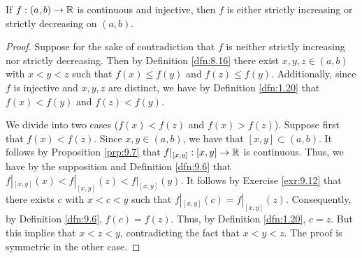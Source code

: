 \documentclass[../main.tex]{subfiles}
\begin{document}
\begin{lemma}\label{lem:9.13}
    If $f:(a,b)\to\mathbb{R}$ is continuous and injective, then $f$ is either strictly increasing or strictly decreasing on $(a,b)$.
    \begin{proof}
        Suppose for the sake of contradiction that $f$ is neither strictly increasing nor strictly decreasing. Then by Definition \ref{dfn:8.16} there exist $x,y,z\in(a,b)$ with $x<y<z$ such that $f(x)\leq f(y)$ and $f(z)\leq f(y)$. Additionally, since $f$ is injective and $x,y,z$ are distinct, we have by Definition \ref{dfn:1.20} that $f(x)<f(y)$ and $f(z)<f(y)$.\par
        We divide into two cases ($f(x)<f(z)$ and $f(x)>f(z)$). Suppose first that $f(x)<f(z)$. Since $x,y\in(a,b)$, we have that $[x,y]\subset(a,b)$. It follows by Proposition \ref{prp:9.7} that $f|_{[x,y]}:[x,y]\to\mathbb{R}$ is continuous. Thus, we have by the supposition and Definition \ref{dfn:9.6} that $f|_{[x,y]}(x)<f|_{[x,y]}(z)<f|_{[x,y]}(y)$. It follows by Exercise \ref{exr:9.12} that there exists $c$ with $x<c<y$ such that $f|_{[x,y]}(c)=f|_{[x,y]}(z)$. Consequently, by Definition \ref{dfn:9.6}, $f(c)=f(z)$. Thus, by Definition \ref{dfn:1.20}, $c=z$. But this implies that $x<z<y$, contradicting the fact that $x<y<z$. The proof is symmetric in the other case.
    \end{proof}
\end{lemma}
\end{document}
